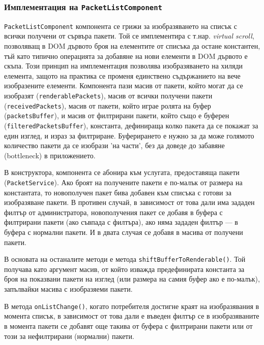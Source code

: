 \documentclass[12pt,a4paper,oneside]{book}
\begin{document}
\subsubsection{Имплементация на \texttt{PacketListComponent}}

\texttt{PacketListComponent} компонента се грижи за изобразяването на списък с
всички получени от сървъра пакети. Той се имплементира с т.нар. \textit{virtual
scroll}, позволяващ в DOM дървото броя на елементите от
списъка да остане константен, тъй като типично операцията за добавяне на нови
елементи в DOM дървото е скъпа. Този принцип на имплементация позволява изобразяването на хиляди
елемента, защото на практика се променя единствено съдържанието на вече
изобразените елементи.
Компонента пази масив от пакети, който могат да се изобразят
(\texttt{renderablePackets}), масив от
всички получени пакети (\texttt{receivedPackets}), масив от пакети, който
играе ролята на буфер (\texttt{packetsBuffer}), и масив от филтрирани пакети,
който също е буферен (\texttt{filteredPacketsBuffer}), константа, дефинираща колко пакета да се
покажат за един изглед, и израз за филтриране. Буферирането е нужно за да може
голямото количество пакети да се изобрази 'на части', без да доведе до забавяне
(bottleneck) в приложението.

В конструктора, компонента се абонира към услугата,
предоставяща пакети (\texttt{PacketService}).  Ако броят на получените
пакети е по-малък от размера
на константата, то новополучен пакет бива добавен към списъка с готови за
изобразяване пакети. В противен случай, в зависимост от това дали има зададен
филтър от администратора, новополучения пакет се добавя в буфера с филтрирани
пакети (ако съвпада с филтъра), ако няма зададен филтър --- в буфера
с нормални пакети. И в двата случая се добавя в масива от получени пакети.

В основата на останалите методи е метода \texttt{shiftBufferToRenderable()}. Той
получава като аргумент масив, от който изважда предефинирата константа за броя
на показвани пакети на изглед (или размера на самия буфер ако е по-малък),
запълвайки масива с изобразяеми пакети.



В метода \texttt{onListChange()}, когато потребителя достигне краят на
изобразявания в момента списък, в зависимост от това дали е въведен филтър се
в изобразяваните в момента пакети се добавят още такива от буфера с филтрирани
пакети или от този за нефилтрирани (нормални) пакети.
\end{document}
